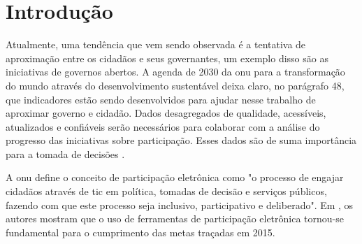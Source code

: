 \chapter[Introdução]{Introdução}
\label{cap:cap1}




\par
Atualmente, uma tendência que vem sendo observada é a tentativa de aproximação entre os cidadãos e seus governantes, um exemplo disso são as iniciativas de governos abertos.
A agenda de 2030 da \acrfull{onu} para a transformação do mundo através do desenvolvimento sustentável deixa claro, no parágrafo 48, que
indicadores estão sendo desenvolvidos para ajudar nesse trabalho de aproximar governo e cidadão. Dados desagregados de qualidade, acessíveis,
atualizados e confiáveis serão necessários para colaborar com a análise do progresso das iniciativas sobre participação. 
Esses dados são de suma importância para a tomada de decisões \cite{assembly2015transforming}.

\par
A \acrshort{onu} define o conceito de participação eletrônica como "o processo de engajar cidadãos através de \acrfull{tic} em política, tomadas de decisão e
serviços públicos, fazendo com que este processo seja inclusivo, participativo e deliberado". Em , os autores mostram que o uso de ferramentas de participação eletrônica tornou-se fundamental para o cumprimento das metas traçadas em 2015. 

